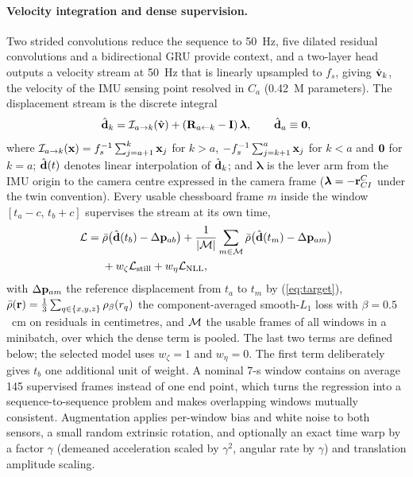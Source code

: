 \paragraph{Velocity integration and dense supervision.}
Two strided convolutions reduce the sequence to 50~Hz, five dilated residual
convolutions and a bidirectional GRU provide context, and a two-layer head
outputs a velocity stream at 50~Hz that is linearly upsampled to $f_s$,
giving $\hat{\bf v}_k$, the velocity of the IMU sensing point resolved in
$C_a$ (0.42~M parameters). The displacement stream is the discrete integral
\begin{equation}
 \hat{\bf d}_k={\cal I}_{a\rightarrow k}(\hat{\bf v})
 +({\bf R}_{a\leftarrow k}-{\bf I})\,\boldsymbol\lambda ,\qquad
 \hat{\bf d}_a\equiv{\bf 0},
 \label{eq:stream}
\end{equation}
where ${\cal I}_{a\rightarrow k}({\bf x})=f_s^{-1}\sum_{j=a+1}^{k}{\bf x}_j$ for
$k>a$, $-f_s^{-1}\sum_{j=k+1}^{a}{\bf x}_j$ for $k<a$ and ${\bf 0}$ for $k=a$;
$\hat{\bf d}(t)$ denotes linear interpolation of $\hat{\bf d}_k$; and
$\boldsymbol\lambda$ is the lever arm from the IMU origin to the camera
centre expressed in the camera frame
($\boldsymbol\lambda=-{\bf r}_{CI}^{C}$ under the twin convention).
Every usable chessboard frame $m$ inside the
window $[t_a-c,\,t_b+c]$ supervises the stream at its own time,
\begin{equation}
 \begin{aligned}
 {\cal L}={}&\bar\rho\big(\hat{\bf d}(t_b)-\Delta{\bf p}_{ab}\big)
 +\frac{1}{|{\cal M}|}\sum_{m\in{\cal M}}
 \bar\rho\big(\hat{\bf d}(t_m)-\Delta{\bf p}_{am}\big)\\
 &+w_\zeta{\cal L}_{\rm still}+w_\eta{\cal L}_{\rm NLL},
 \end{aligned}
 \label{eq:loss}
\end{equation}
with $\Delta{\bf p}_{am}$ the reference displacement from $t_a$ to $t_m$ by
(\ref{eq:target}), $\bar\rho({\bf r})=\frac13\sum_{q\in\{x,y,z\}}\rho_\beta(r_q)$
the component-averaged smooth-$L_1$ loss with $\beta=0.5$~cm on residuals in
centimetres, and ${\cal M}$ the usable frames of all windows in a minibatch,
over which the dense term is pooled. The last two terms are defined below; the
selected model uses $w_\zeta=1$ and $w_\eta=0$. The first term deliberately
gives $t_b$ one additional unit of weight. A nominal 7-s window contains on average 145 supervised frames instead of one end point, which turns the
regression into a sequence-to-sequence problem and makes overlapping windows
mutually consistent. Augmentation applies per-window bias and white noise to
both sensors, a small random extrinsic rotation, and optionally an exact
time warp by a factor $\gamma$ (demeaned acceleration scaled by $\gamma^2$,
angular rate by $\gamma$) and translation amplitude scaling.

